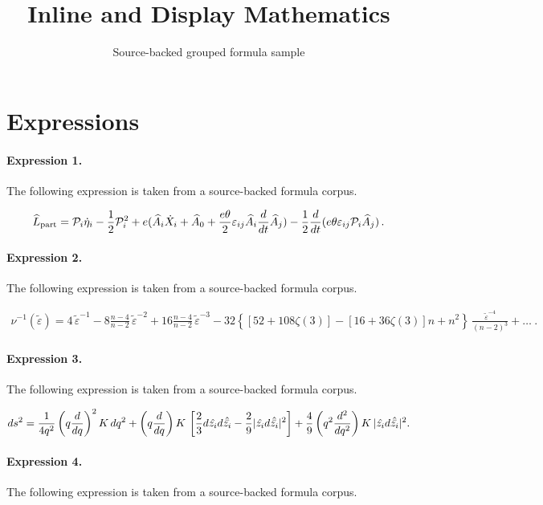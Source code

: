 \documentclass[11pt]{article}
\title{Inline and Display Mathematics}
\author{Source-backed grouped formula sample}
\date{}
\begin{document}
\maketitle
\section{Expressions}
\paragraph{Expression 1.} The following expression is taken from a source-backed formula corpus.

\begin{align*}\widehat{L}_{\rm part} = {\cal P}_i \dot{\eta}_i - \frac{1}{2}{\cal P}_i^{2} + e( \widehat{A}_i \dot{X}_i + \widehat{A}_0 +\frac{e\theta}{2} \varepsilon_{ij} \widehat{A}_i \frac{d}{dt}\widehat{A}_j) - \frac{1}{2} \frac{d}{dt} (e \theta\varepsilon_{ij} {\cal P}_i \widehat{A}_j )\, .\end{align*}

\paragraph{Expression 2.} The following expression is taken from a source-backed formula corpus.

\begin{align*}\nu ^{-1}(\tilde \varepsilon )= {4}\,{\tilde \varepsilon^{-1} }-8 \frac{n-4}{n-2}\,\tilde \varepsilon^{-2}+16 \frac{n-4}{n-2}\,\tilde \varepsilon^{-3 }-32 \left\{\left[52+108\zeta(3)\right]-\left[16+36\zeta(3)\right]n+n^2 \right\} \,\frac{\tilde \varepsilon^{-4 }}{(n-2)^3}+\dots~.\end{align*}

\paragraph{Expression 3.} The following expression is taken from a source-backed formula corpus.

\begin{align*}ds^2 = {1 \over 4q^2} \left(q {d \over dq}\right)^2 K\, dq^2 + \left(q {d \over dq}\right) K\, \left[{2 \over 3} d\hat{z_i} d\hat{\bar{z_i}} - {2 \over 9} | \hat{z_i} d\hat{\bar{z_i}}|^2 \right] + {4 \over 9} \left(q^2 {d^2 \over dq^2}\right) K \, | \hat{z_i} d\hat{\bar{z_i}}|^2 .\end{align*}

\paragraph{Expression 4.} The following expression is taken from a source-backed formula corpus.
\end{document}
